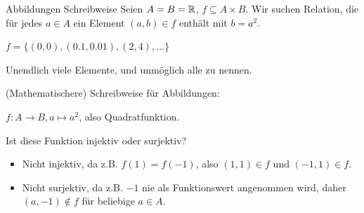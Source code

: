 \begin{frame}{Abbildungen Schreibweise}
	Seien $A = B = \mathbb{R}$, $f \subseteq A \times B$. \pause Wir suchen Relation, die für jedes $a \in A$ ein Element $(a, b) \in f$ enthält mit $b = a^2$.\pause
	
	$f = \{(0, 0), (0.1, 0.01), (2, 4), \dots\}$ 
	
	\pause Unendlich viele Elemente, und unmöglich alle zu nennen.
	
	\pause(Mathematischere) Schreibweise für Abbildungen:\pause
	
	$f : A \rightarrow B, a \mapsto a^2$\pause , also Quadratfunktion.
	
	\pause Ist diese Funktion injektiv oder surjektiv? \pause 
	
	\begin{itemize}
		\item Nicht injektiv, da z.B. $f(1) = f(-1)$\pause , also $(1, 1) \in f$ und $(-1, 1) \in f$.\pause
		\item Nicht surjektiv, da z.B. $-1$ nie als Funktionswert angenommen wird\pause , daher $(a, -1) \not\in f$ für beliebige $a \in A$.
	
	\end{itemize}
	
\end{frame}


